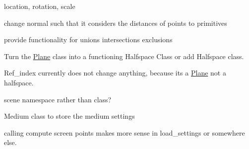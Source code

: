 
\begin{DoxyRefList}
\item[Class \mbox{\hyperlink{class_cube}{Cube}} ]\label{todo__todo000004}%
%
location, rotation, scale 
\item[Class \mbox{\hyperlink{class_intersection}{Intersection}} ]\label{todo__todo000003}%
%
change normal such that it considers the distances of points to primitives 
\item[File \mbox{\hyperlink{objects_8h}{objects.h}} ]\label{todo__todo000001}%
%
provide functionality for unions intersections exclusions 
\item[Class \mbox{\hyperlink{class_plane}{Plane}} ]\label{todo__todo000002}%
%
Turn the \mbox{\hyperlink{class_plane}{Plane}} class into a functioning Halfspace Class or add Halfspace class.  
\item[Member \mbox{\hyperlink{class_plane_aaee6cbbc577efe76951da565f9f4c7b3}{Plane\+::Plane}} (Vector3d location, Vector3d rotation, Vector3d ambient, Vector3d diffuse, Vector3d specular, Vector3d reflected, Vector3d refracted, double shininess, double ref\+\_\+index)]\label{todo__todo000005}%
%
Ref\+\_\+index currently does not change anything, because its a \mbox{\hyperlink{class_plane}{Plane}} not a halfspace.  
\item[Class \mbox{\hyperlink{class_scene}{Scene}} ]\label{todo__todo000006}%
%
scene namespace rather than class? 



Medium class to store the medium settings  
\item[Member \mbox{\hyperlink{class_scene_a477f8f9af5573b07fcd82b63e35cc117}{Scene\+::render\+\_\+imag}} ()]\label{todo__todo000007}%
%
calling compute screen points makes more sense in load\+\_\+settings or somewhere else. 
\end{DoxyRefList}